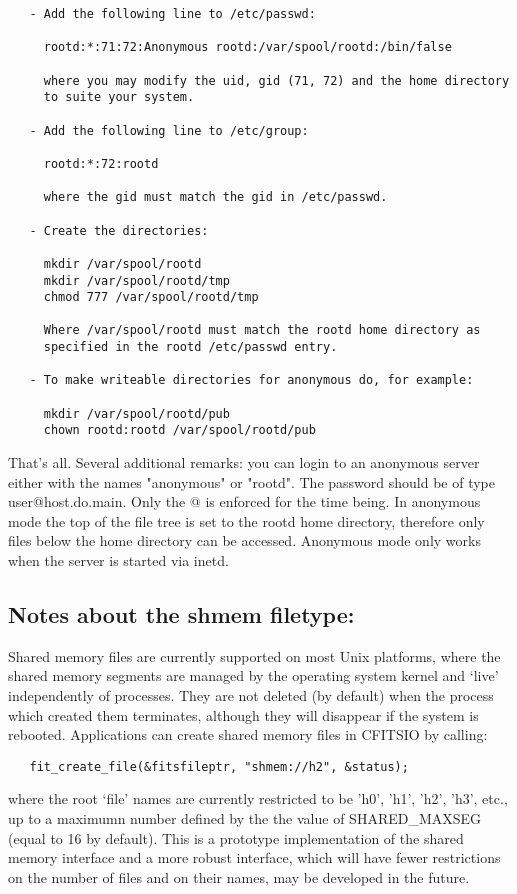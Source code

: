 \documentclass[11pt]{book}
\begin{document}
\begin{verbatim}
   - Add the following line to /etc/passwd:

     rootd:*:71:72:Anonymous rootd:/var/spool/rootd:/bin/false

     where you may modify the uid, gid (71, 72) and the home directory
     to suite your system.

   - Add the following line to /etc/group:

     rootd:*:72:rootd

     where the gid must match the gid in /etc/passwd.

   - Create the directories:

     mkdir /var/spool/rootd
     mkdir /var/spool/rootd/tmp
     chmod 777 /var/spool/rootd/tmp

     Where /var/spool/rootd must match the rootd home directory as
     specified in the rootd /etc/passwd entry.

   - To make writeable directories for anonymous do, for example:

     mkdir /var/spool/rootd/pub
     chown rootd:rootd /var/spool/rootd/pub
\end{verbatim}
That's all.  Several additional remarks:  you can login to an anonymous
server either with the names "anonymous" or "rootd".  The password should
be of type user@host.do.main. Only the @ is enforced for the time
being.  In anonymous mode the top of the file tree is set to the rootd
home directory, therefore only files below the home directory can be
accessed.  Anonymous mode only works when the server is started via
inetd.


\subsection{Notes about the shmem filetype:}

Shared memory files are currently supported on most Unix platforms,
where the shared memory segments are managed by the operating system
kernel and `live' independently of processes. They are not deleted (by
default) when the process which created them terminates, although they
will disappear if the system is rebooted.  Applications can create
shared memory files in CFITSIO by calling:

\begin{verbatim}
   fit_create_file(&fitsfileptr, "shmem://h2", &status);
\end{verbatim}
where the root `file' names are currently restricted to be 'h0', 'h1',
'h2', 'h3', etc., up to a maximumn number defined by the the value of
SHARED\_MAXSEG (equal to 16 by default).  This is a prototype
implementation of the shared memory interface and a more robust
interface, which will have fewer restrictions on the number of files
and on their names, may be developed in the future.
\end{document}
